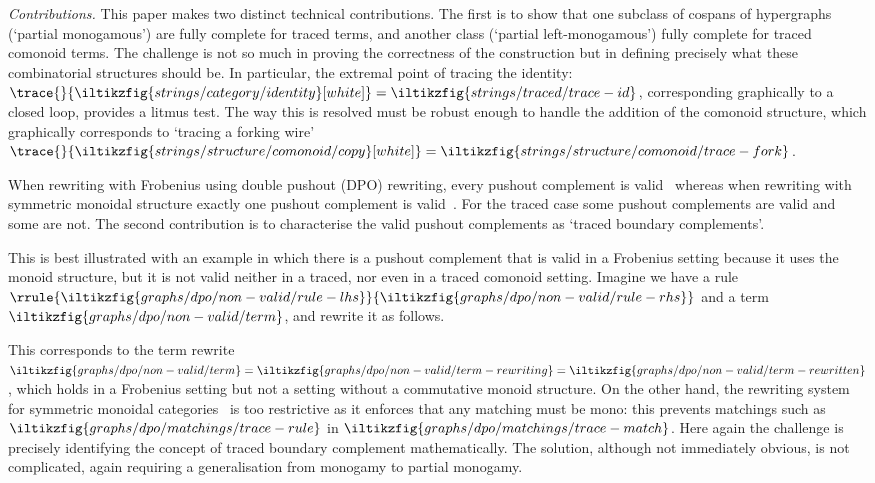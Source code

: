 \emph{Contributions.}
This paper makes two distinct technical contributions.
The first is to show that one subclass of cospans of hypergraphs (`partial
monogamous') are fully complete for traced terms, and another class
(`partial left-monogamous') fully complete for traced comonoid terms.
The challenge is not so much in proving the correctness of the construction but
in defining precisely what these combinatorial structures should be.
In particular, the extremal point of tracing the identity: \(
    \trace{}{
        \iltikzfig{strings/category/identity}[white]
    }
    =
    \iltikzfig{strings/traced/trace-id}
\), corresponding graphically to a closed loop, provides a litmus test.
The way this is resolved must be robust enough to handle the addition of the
comonoid structure, which graphically corresponds to `tracing a forking wire' \(
    \trace{}{
        \iltikzfig{strings/structure/comonoid/copy}[white]
    }
    =
    \iltikzfig{strings/structure/comonoid/trace-fork}
\).

When rewriting with Frobenius using double pushout (DPO) rewriting, every
pushout complement is valid~\cite{bonchi2022string} whereas when rewriting with
symmetric monoidal structure exactly one pushout complement is
valid~\cite{bonchi2022stringa}.
For the traced case some pushout complements are valid and some are not.
The second contribution is to characterise the valid pushout complements as
`traced boundary complements'.

This is best illustrated with an example in which there is a pushout
complement that is valid in a Frobenius setting because it uses the monoid
structure, but it is not valid neither in a traced, nor even in a traced
comonoid setting.
Imagine we have a rule \(\rrule{
    \iltikzfig{graphs/dpo/non-valid/rule-lhs}
}{
    \iltikzfig{graphs/dpo/non-valid/rule-rhs}
}\) and a term \(
    \iltikzfig{graphs/dpo/non-valid/term}
\), and rewrite it as follows.
\begin{center}
    
\end{center}
This corresponds to the term rewrite \(
    \iltikzfig{graphs/dpo/non-valid/term}
    =
    \iltikzfig{graphs/dpo/non-valid/term-rewriting}
    =
    \iltikzfig{graphs/dpo/non-valid/term-rewritten}
\), which holds in a Frobenius setting but not a setting without a commutative
monoid structure.
On the other hand, the rewriting system for symmetric monoidal
categories~\cite{bonchi2022stringa} is too restrictive as it enforces that any
matching must be mono: this prevents matchings such as \(
    \iltikzfig{graphs/dpo/matchings/trace-rule}
\) in \(
    \iltikzfig{graphs/dpo/matchings/trace-match}
\).
Here again the challenge is precisely identifying the concept of traced boundary
complement mathematically.
The solution, although not immediately obvious, is not complicated, again
requiring a generalisation from monogamy to partial monogamy.
